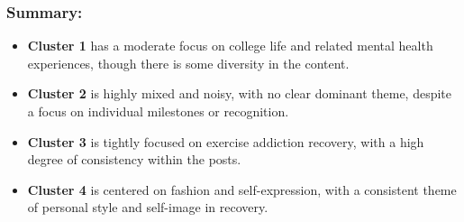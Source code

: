 \documentclass[
]{article}
\begin{document}
\subsubsection{Summary:}\label{summary}

\begin{itemize}
\item
  \textbf{Cluster 1} has a moderate focus on college life and related
  mental health experiences, though there is some diversity in the
  content.
\item
  \textbf{Cluster 2} is highly mixed and noisy, with no clear dominant
  theme, despite a focus on individual milestones or recognition.
\item
  \textbf{Cluster 3} is tightly focused on exercise addiction recovery,
  with a high degree of consistency within the posts.
\item
  \textbf{Cluster 4} is centered on fashion and self-expression, with a
  consistent theme of personal style and self-image in recovery.
\end{itemize}
\end{document}
